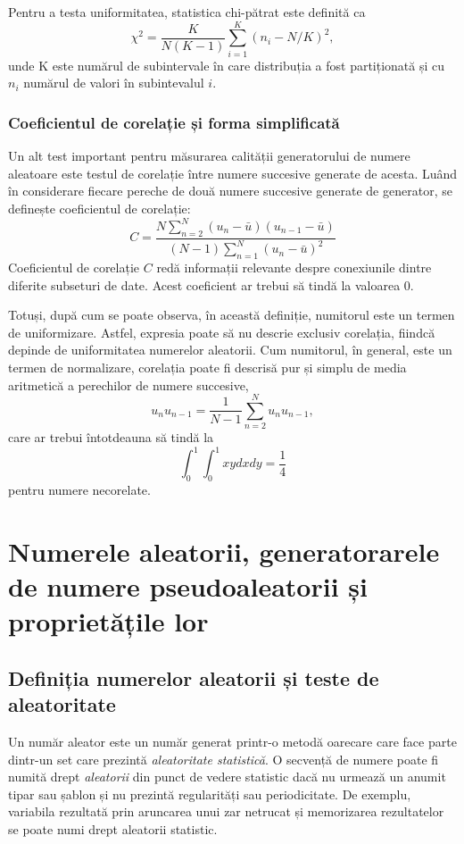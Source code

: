 Pentru a testa uniformitatea, statistica chi-pătrat este definită ca
\[
\chi^2 = \frac{K}{N(K-1)}\sum^K_{i=1}(n_i - N/K)^2,
\]
unde K este numărul de subintervale în care distribuția a fost partiționată și cu $n_i$ numărul de valori în subintevalul $i$.

\subsubsection{Coeficientul de corelație și forma simplificată}

Un alt test important pentru măsurarea calității generatorului de numere aleatoare este testul de corelație între numere succesive generate de acesta. Luând în considerare fiecare pereche de două numere succesive generate de generator, se definește coeficientul de corelație:
\[
C = \frac{N\sum^N_{n=2}(u_n-\bar{u})(u_{n-1}-\bar{u})}{(N-1)\sum^N_{n=1}(u_n-\bar{u})^2}
\]
Coeficientul de corelație $C$ redă informații relevante despre conexiunile dintre diferite subseturi de date. Acest coeficient ar trebui să tindă la valoarea 0.

Totuși, după cum se poate observa, în această definiție, numitorul este un  termen de uniformizare. Astfel, expresia poate să nu descrie exclusiv corelația, fiindcă depinde de uniformitatea numerelor aleatorii. Cum numitorul, în general, este un termen de normalizare, corelația poate fi descrisă pur și simplu de media aritmetică a perechilor de numere succesive,
\[
u_n u_{n-1} = \frac{1}{N-1}\sum^N_{n=2}u_n u_{n-1},
\]
care ar trebui întotdeauna să tindă la
\[
\int_0^1 \int_0^1 xydxdy = \frac{1}{4}
\]
pentru numere necorelate. 
\pagebreak
\section{Numerele aleatorii, generatorarele de numere pseudoaleatorii și proprietățile lor}
\subsection{Definiția numerelor aleatorii și teste de aleatoritate}
Un număr aleator este un număr generat printr-o metodă oarecare care face parte dintr-un set care prezintă \textit{aleatoritate statistică}. O secvență de numere poate fi numită drept \textit{aleatorii} din punct de vedere statistic dacă nu urmează un anumit tipar sau șablon și nu prezintă regularități sau periodicitate. De exemplu, variabila rezultată prin aruncarea unui zar netrucat și memorizarea rezultatelor se poate numi drept aleatorii statistic. 

